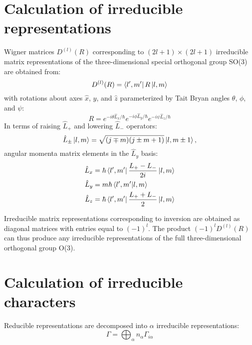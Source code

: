 \documentclass[preprint,showpacs,preprintnumbers,superscriptaddress,prb,floatfix,aps]{revtex4-1}
\begin{document}
\section{Calculation of irreducible representations}
Wigner matrices $D^{(l)}(R)$ corresponding to $(2l+1)\times(2l+1)$ irreducible matrix representations of the three-dimensional special orthogonal group SO(3) are obtained from:\cite{martin_electronic_2004}
\begin{equation}
\label{eq:imselfenergy}
D^{(l)}(R) = \bra{l',m'} R \ket{l,m}
\end{equation}
with rotations about axes $\hat{x}$, $\hat{y}$, and $\hat{z}$ parameterized by Tait Bryan angles $\theta$, $\phi$, and $\psi$:
\begin{equation}
R = e^{-i\theta\hat{L}_x/\hbar} e^{-i\phi\hat{L}_y/\hbar} e^{-i\psi\hat{L}_z/\hbar}
\end{equation}
%
In terms of raising $\hat{L}_+$ and lowering $\hat{L}_-$ operators:
\begin{equation}
\label{eq:raising_lowering_operator}
\hat{L}_{\pm}\ket{l,m} = \sqrt{(j\mp m)(j\pm m+1)}\ket{l,m\pm1},
\end{equation}
angular momenta matrix elements in the $\hat{L}_y$ basis:\cite{shankar_fundamentals_2014}
\begin{align}
\label{eq:angular_momenta}
\hat{L}_x & =   \hbar \bra{l',m'} \frac{L_{+}-L_{-}}{2i} \ket{l,m} \\
\hat{L}_y & = m \hbar \braket{l',m'}{l,m} \\
\hat{L}_z & =   \hbar \bra{l',m'} \frac{L_{+}+L_{-}}{2} \ket{l,m}
\end{align}

Irreducible matrix representations corresponding to inversion are obtained as diagonal matrices with entries equal to $(-1)^l$. The product $(-1)^{l} D^{(l)}(R)$  can thus produce any irreducible representations of the full three-dimensional orthogonal group O(3).\cite{sharma_general_1979,el-batanouny_symmetry_2008} %



%
%
%
\section{Calculation of irreducible characters}
Reducible representations are decomposed into $\alpha$ irreducible representations:
\begin{equation}
\label{eq:irrep_decomposition}
\Gamma = \bigoplus_\alpha n_\alpha \Gamma_{i\alpha}
\end{equation}
\end{document}

